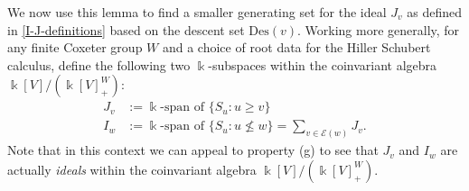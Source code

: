 \documentclass[12pt,dvips]{amsart}
\theoremstyle{plain}
\theoremstyle{definition}
\theoremstyle{remark}
\numberwithin{equation}{section}
\def\Ess{{\mathcal{E}}}
\def\Des{\mathrm{Des}}
\begin{document}
We now use this lemma to find a smaller generating set for the ideal
$J_v$ as defined in \eqref{I-J-definitions} based on the descent set
$\Des(v)$.  Working more generally, for any finite Coxeter group $W$
and a choice of root data for the Hiller Schubert calculus,
define the following two $\Bbbk$-subspaces within the coinvariant
algebra $\Bbbk[V]/(\Bbbk[V]^W_+)$:
\begin{equation}
\label{Hiller-I-and-J-definitions}
\begin{aligned}
J_v&:=\Bbbk\text{-span of }\{ S_u: u \geq v \}\\
I_w&:=\Bbbk\text{-span of }\{ S_u: u \not\leq w\} = \sum_{v\in\Ess(w)} J_v.
\end{aligned}
\end{equation}
Note that in this context we can appeal to property (g) to see that
$J_v$ and $I_w$ are actually {\it ideals} within the coinvariant algebra
$\Bbbk[V]/(\Bbbk[V]^W_+)$.
\end{document}
